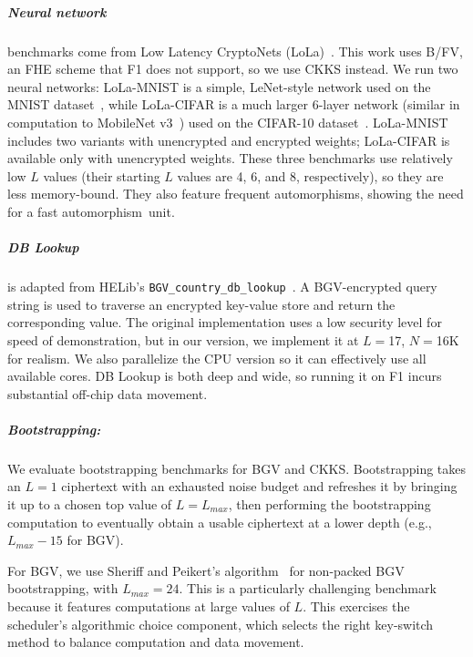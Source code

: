\subparagraph{Neural network} benchmarks come from Low Latency CryptoNets (LoLa)~\cite{brutzkus:icml19:low}.
This work uses B/FV, an FHE scheme that F1 does not support, so we use CKKS instead.
We run two neural networks:
LoLa-MNIST is a simple, LeNet-style network used on the MNIST dataset~\cite{lecunn:ieee98:gradient-document},
while LoLa-CIFAR is a much larger 6-layer network (similar in computation to MobileNet v3~\cite{howard2019searching})
used on the CIFAR-10 dataset~\cite{cifar10}.
LoLa-MNIST includes two variants with unencrypted and encrypted weights;
LoLa-CIFAR is available only with unencrypted weights.
These three benchmarks use relatively low $L$ values (their starting $L$ values are 4, 6, and 8, respectively),
so they are less memory-bound.
They also feature frequent automorphisms,
showing the need for a fast automorphism~unit.


\tblFOneGF %

\subparagraph{DB Lookup} is adapted from HELib's \texttt{BGV\_country\_db\_lookup}~\cite{helib:db-lookup}. A BGV-encrypted query string is used to traverse an encrypted key-value store and return the corresponding value. The original implementation uses a low security level for speed of demonstration, but in our version, we implement it at $L=$17, $N=$16K for realism. We also parallelize the CPU version so it can effectively use all available cores. DB Lookup is both deep and wide, so running it on F1 incurs substantial off-chip data movement.

\addtocounter{table}{1}
\tblFOneMicrobenchmark

\subparagraph{Bootstrapping:} We evaluate bootstrapping benchmarks for BGV and CKKS.
Bootstrapping takes an $L=1$ ciphertext with an exhausted noise budget and refreshes it
by bringing it up to a chosen top value of $L=L_{max}$, then performing the bootstrapping computation
to eventually obtain a usable ciphertext at a lower depth (e.g., $L_{max} - 15$ for BGV).

For BGV, we use Sheriff and Peikert's algorithm~\cite{alperin:crypto13:practical} for non-packed BGV boot\-strap\-ping, with $L_{max} = 24$.
This is a particularly challenging benchmark because it features computations at large values of $L$.
This exercises the scheduler's 
algorithmic choice component, which selects
the right key-switch method to balance computation and data movement.

